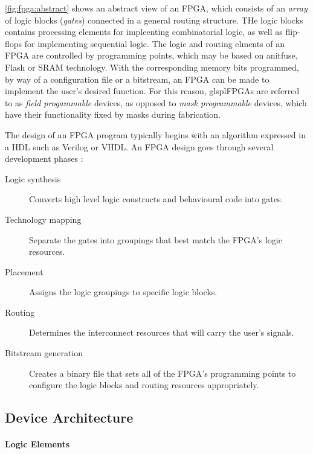 \autoref{fig:fpga:abstract} shows an abstract view of an \gls{FPGA}, which
consists of an \emph{array} of logic blocks (\emph{gates}) connected in a
general routing structure. THe logic blocks contains processing elements for
impleenting combinatorial logic, as well as flip-flops for implementing
sequential logic. The logic and routing elments of an \gls{FPGA} are controlled
by programming points, which may be based on anitfuse, Flash  or \gls{SRAM}
technology. With the corresponding memory bits programmed, by way of a
configuration file or a bitstream, an \gls{FPGA} can be made to implement the
user's desired function. For this reason, glspl{FPGAs} are referred to as
\emph{field progammable} devices, as opposed to \emph{mask programmable}
devices, which have their  functionality fixed by masks during fabrication.

The design of an \gls{FPGA} program typically begins with an algorithm expressed
in a \gls{HDL} such as Verilog or \gls{VHDL}. An \gls{FPGA} design goes through
several development phases \cite{Hauck:2007}:
\begin{description}
    \item[Logic synthesis] Converts high level logic constructs and behavioural
        code into gates.
    \item[Technology mapping] Separate the gates into groupings that best match
        the \gls{FPGA}'s logic resources.
    \item[Placement] Assigns the logic groupings to specific logic blocks.
    \item[Routing] Determines the interconnect resources that will carry the
        user's signals.
    \item[Bitstream generation] Creates a binary file that sets all of the
        \gls{FPGA}'s programming points to configure the logic blocks and
        routing resources appropriately.
\end{description}

\subsection{Device Architecture}
\label{fpga:deviceArchitecture}

\paragraph{Logic Elements}
\label{fpga:deviceArchitecture:logicElements}

